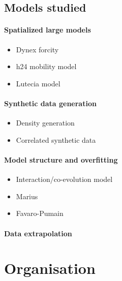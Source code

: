 \subsection{Models studied}


\paragraph{Spatialized large models}

\begin{itemize}
\item Dynex forcity 
\item h24 mobility model
\item Lutecia model \cite{lenechet:halshs-01272236}
\end{itemize}


\paragraph{Synthetic data generation}

\begin{itemize}
\item Density generation \cite{raimbault2017calibration}
\item Correlated synthetic data \cite{raimbault2016generation}
\end{itemize}


\paragraph{Model structure and overfitting}

\begin{itemize}
\item Interaction/co-evolution model
\item Marius
\item Favaro-Pumain \cite{raimbault2016generation}
\end{itemize}


\paragraph{Data extrapolation}






\section{Organisation}
















